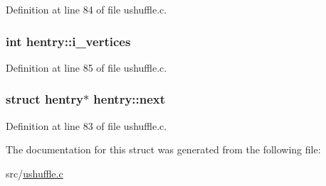 Definition at line 84 of file ushuffle.\+c.

\hypertarget{structhentry_a72c714e369c96f7f198462dbc7a6e21d}{
\subsubsection[{i\+\_\+vertices}]{\setlength{\rightskip}{0pt plus 5cm}int hentry\+::i\+\_\+vertices}}\label{structhentry_a72c714e369c96f7f198462dbc7a6e21d}


Definition at line 85 of file ushuffle.\+c.

\hypertarget{structhentry_a94f2927d851d194c036657b96aeb8a08}{
\subsubsection[{next}]{\setlength{\rightskip}{0pt plus 5cm}struct {\bf hentry}$\ast$ hentry\+::next}}\label{structhentry_a94f2927d851d194c036657b96aeb8a08}


Definition at line 83 of file ushuffle.\+c.



The documentation for this struct was generated from the following file\+:\begin{DoxyCompactItemize}
\item 
src/\hyperlink{ushuffle_8c}{ushuffle.\+c}\end{DoxyCompactItemize}
